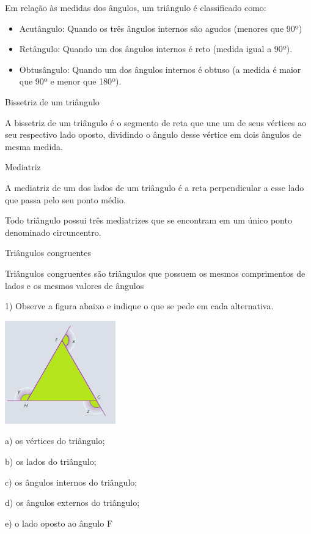 Em relação às medidas dos ângulos, um triângulo é classificado como:

\begin{itemize}
\item
  Acutângulo: Quando os três ângulos internos são agudos (menores que
  90º)
\item
  Retângulo: Quando um dos ângulos internos é reto (medida igual a 90º).
\item
  Obtusângulo: Quando um dos ângulos internos é obtuso (a medida é maior
  que 90º e menor que 180º).
\end{itemize}

Bissetriz de um triângulo

A bissetriz de um triângulo é o segmento de reta que une um de seus
vértices ao seu respectivo lado oposto, dividindo o ângulo desse vértice
em dois ângulos de mesma medida.

Mediatriz

A mediatriz de um dos lados de um triângulo é a reta perpendicular a
esse lado que passa pelo seu ponto médio.

Todo triângulo possui três mediatrizes que se encontram em um único
ponto denominado circuncentro.

Triângulos congruentes

Triângulos congruentes são triângulos que possuem os mesmos comprimentos
de lados e os mesmos valores de ângulos


1) Observe a figura abaixo e indique o que se pede em cada alternativa.

\includegraphics[width=1.88333in,height=1.75048in]{./imgSAEB_8_MAT/media/image13.png}

a) os vértices do triângulo;

b) os lados do triângulo;

c) os ângulos internos do triângulo;

d) os ângulos externos do triângulo;

e) o lado oposto ao ângulo F

